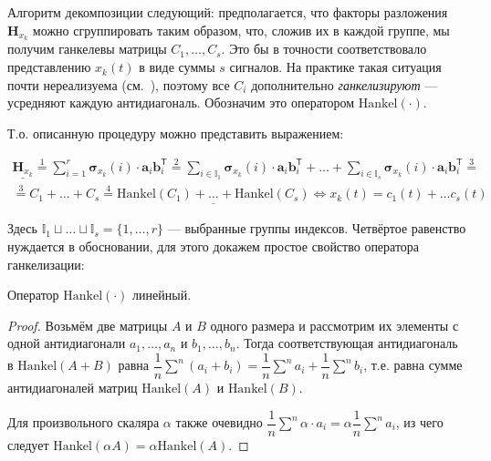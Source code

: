 	    	Алгоритм декомпозиции следующий: предполагается, что факторы разложения $ \mathbf{H}_{x_k} $ можно сгруппировать таким образом, что, сложив их в каждой группе, мы получим ганкелевы матрицы $ C_1, \ldots, C_s $. Это бы в точности соответствовало представлению $ x_k(t) $ в виде суммы $ s $ сигналов. На практике такая ситуация почти нереализуема (см.~\cite{ecfb9dc578be43ae9ee8fc88b8ff9151}), поэтому все $ C_i $ дополнительно \emph{ганкелизируют} --- усредняют каждую антидиагональ. Обозначим это оператором $ \text{Hankel}(\cdot) $. 
	    	
	    	Т.о. описанную процедуру можно представить выражением:
	    	
	    	\begin{multline}\label{eq:decomp_method_ideal}
	    		\underline{\mathbf{H}_{x_k}} \overset{1}{=} \sum\limits_{i = 1}^{r} \boldsymbol{\sigma}_{x_k}(i) \cdot \mathbf{a}_i  \mathbf{b}_i^{\mathsf{T}} \overset{2}{=} \sum\limits_{i \in \mathbb{I}_1} \boldsymbol{\sigma}_{x_k}(i) \cdot \mathbf{a}_i  \mathbf{b}_i^{\mathsf{T}} + \ldots + \sum\limits_{i \in \mathbb{I}_s} \boldsymbol{\sigma}_{x_k}(i) \cdot \mathbf{a}_i  \mathbf{b}_i^{\mathsf{T}} \overset{3}{=} \\ \overset{3}{=} C_1 + \ldots + C_s \overset{4}{=} \underline{\text{Hankel}(C_1) + \ldots + \text{Hankel}(C_s)}  \Leftrightarrow x_k(t) = c_1(t) + \ldots c_s(t)
	    	\end{multline}
	    	
	    	Здесь $ \mathbb{I}_1 \sqcup \ldots \sqcup \mathbb{I}_s = \{1, \ldots, r\} $ --- выбранные группы индексов. Четвёртое равенство нуждается в обосновании, для этого докажем простое свойство оператора ганкелизации:
	    	
	    	\begin{Lem}
	    		Оператор $ \text{Hankel}(\cdot) $ линейный.
	    	\end{Lem}
	    	
	    	\begin{proof}
	    		Возьмём две матрицы $ A $ и $ B $ одного размера и рассмотрим их элементы с одной антидиагонали $ a_1, \ldots, a_n $ и $ b_1, \ldots, b_n $. Тогда соответствующая антидиагональ в $ \text{Hankel}(A + B) $ равна $ \dfrac{1}{n} \sum\limits^n (a_i + b_i) = \dfrac{1}{n} \sum\limits^n a_i + \dfrac{1}{n} \sum\limits^n b_i $, т.е. равна сумме антидиагоналей матриц $ \text{Hankel}(A) $ и $ \text{Hankel}(B) $.
	    		
	    		Для произвольного скаляра $ \alpha $ также очевидно $ \dfrac{1}{n} \sum\limits^n \alpha \cdot a_i = \alpha \dfrac{1}{n} \sum\limits^n a_i $, из чего следует $ \text{Hankel}(\alpha A) = \alpha \text{Hankel}(A) $.
	    	\end{proof}
	    	
